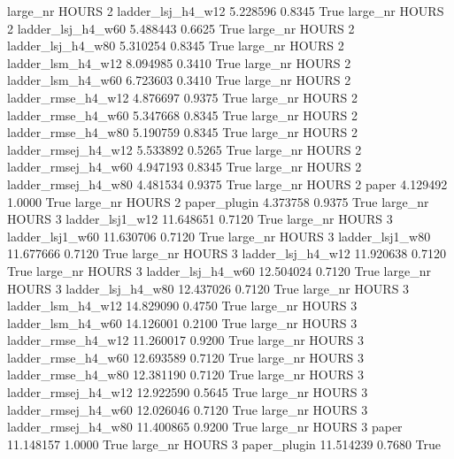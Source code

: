   large_nr    HOURS                 2   ladder_lsj_h4_w12    5.228596      0.8345    True
  large_nr    HOURS                 2   ladder_lsj_h4_w60    5.488443      0.6625    True
  large_nr    HOURS                 2   ladder_lsj_h4_w80    5.310254      0.8345    True
  large_nr    HOURS                 2   ladder_lsm_h4_w12    8.094985      0.3410    True
  large_nr    HOURS                 2   ladder_lsm_h4_w60    6.723603      0.3410    True
  large_nr    HOURS                 2  ladder_rmse_h4_w12    4.876697      0.9375    True
  large_nr    HOURS                 2  ladder_rmse_h4_w60    5.347668      0.8345    True
  large_nr    HOURS                 2  ladder_rmse_h4_w80    5.190759      0.8345    True
  large_nr    HOURS                 2 ladder_rmsej_h4_w12    5.533892      0.5265    True
  large_nr    HOURS                 2 ladder_rmsej_h4_w60    4.947193      0.8345    True
  large_nr    HOURS                 2 ladder_rmsej_h4_w80    4.481534      0.9375    True
  large_nr    HOURS                 2               paper    4.129492      1.0000    True
  large_nr    HOURS                 2        paper_plugin    4.373758      0.9375    True
  large_nr    HOURS                 3     ladder_lsj1_w12   11.648651      0.7120    True
  large_nr    HOURS                 3     ladder_lsj1_w60   11.630706      0.7120    True
  large_nr    HOURS                 3     ladder_lsj1_w80   11.677666      0.7120    True
  large_nr    HOURS                 3   ladder_lsj_h4_w12   11.920638      0.7120    True
  large_nr    HOURS                 3   ladder_lsj_h4_w60   12.504024      0.7120    True
  large_nr    HOURS                 3   ladder_lsj_h4_w80   12.437026      0.7120    True
  large_nr    HOURS                 3   ladder_lsm_h4_w12   14.829090      0.4750    True
  large_nr    HOURS                 3   ladder_lsm_h4_w60   14.126001      0.2100    True
  large_nr    HOURS                 3  ladder_rmse_h4_w12   11.260017      0.9200    True
  large_nr    HOURS                 3  ladder_rmse_h4_w60   12.693589      0.7120    True
  large_nr    HOURS                 3  ladder_rmse_h4_w80   12.381190      0.7120    True
  large_nr    HOURS                 3 ladder_rmsej_h4_w12   12.922590      0.5645    True
  large_nr    HOURS                 3 ladder_rmsej_h4_w60   12.026046      0.7120    True
  large_nr    HOURS                 3 ladder_rmsej_h4_w80   11.400865      0.9200    True
  large_nr    HOURS                 3               paper   11.148157      1.0000    True
  large_nr    HOURS                 3        paper_plugin   11.514239      0.7680    True
